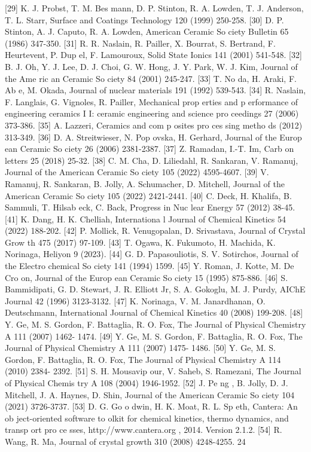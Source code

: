 \documentclass[10pt, letterpaper]{article}
\begin{document}
[29]
 K. J. Probst, T. M. Bes mann, D. P. Stinton, R. A. Lowden, T. J. Anderson, T. L. Starr, Surface and
Coatings Technology 120 (1999) 250-258.
[30]
 D. P. Stinton, A. J. Caputo, R. A. Lowden, American Ceramic So ciety Bulletin 65 (1986) 347-350.
[31]
 R. R. Naslain, R. Pailler, X. Bourrat, S. Bertrand, F. Heurtevent, P. Dup el, F. Lamouroux, Solid State
Ionics 141 (2001) 541-548.
[32]
 B. J. Oh, Y. J. Lee, D. J. Choi, G. W. Hong, J. Y. Park, W. J. Kim, Journal of the Ame ric an Ceramic
So ciety 84 (2001) 245-247.
[33]
 T. No da, H. Araki, F. Ab e, M. Okada, Journal of nuclear materials 191 (1992) 539-543.
[34]
 R. Naslain, F. Langlais, G. Vignoles, R. Pailler, Mechanical prop erties and p erformance of engineering
ceramics I I: ceramic engineering and science pro ceedings 27 (2006) 373-386.
[35]
 A. Lazzeri, Ceramics and com p osites pro ces sing metho ds (2012) 313-349.
[36]
 D. A. Streitwieser, N. Pop ovska, H. Gerhard, Journal of the Europ ean Ceramic So ciety 26 (2006)
2381-2387.
[37]
 Z. Ramadan, I.-T. Im, Carb on letters 25 (2018) 25-32.
[38]
 C. M. Cha, D. Liliedahl, R. Sankaran, V. Ramanuj, Journal of the American Ceramic So ciety 105 (2022)
4595-4607.
[39]
 V. Ramanuj, R. Sankaran, B. Jolly, A. Schumacher, D. Mitchell, Journal of the American Ceramic
So ciety 105 (2022) 2421-2441.
[40]
 C. Deck, H. Khalifa, B. Sammuli, T. Hilsab eck, C. Back, Progress in Nuc lear Energy 57 (2012) 38-45.
[41]
 K. Dang, H. K. Chelliah, Internationa l Journal of Chemical Kinetics 54 (2022) 188-202.
[42]
 P. Mollick, R. Venugopalan, D. Srivastava, Journal of Crystal Grow th 475 (2017) 97-109.
[43]
 T. Ogawa, K. Fukumoto, H. Machida, K. Norinaga, Heliyon 9 (2023).
[44]
 G. D. Papasouliotis, S. V. Sotirchos, Journal of the Electro chemical So ciety 141 (1994) 1599.
[45]
 Y. Roman, J. Kotte, M. De Cro on, Journal of the Europ ean Ceramic So ciety 15 (1995) 875-886.
[46]
 S. Bammidipati, G. D. Stewart, J. R. Elliott Jr, S. A. Gokoglu, M. J. Purdy, AIChE Journal 42 (1996)
3123-3132.
[47]
 K. Norinaga, V. M. Janardhanan, O. Deutschmann, International Journal of Chemical Kinetics 40
(2008) 199-208.
[48]
 Y. Ge, M. S. Gordon, F. Battaglia, R. O. Fox, The Journal of Physical Chemistry A 111 (2007) 1462-
1474.
[49]
 Y. Ge, M. S. Gordon, F. Battaglia, R. O. Fox, The Journal of Physical Chemistry A 111 (2007) 1475-
1486.
[50]
 Y. Ge, M. S. Gordon, F. Battaglia, R. O. Fox, The Journal of Physical Chemistry A 114 (2010) 2384-
2392.
[51]
 S. H. Mousavip our, V. Saheb, S. Ramezani, The Journal of Physical Chemis try A 108 (2004) 1946-1952.
[52]
 J. Pe ng , B. Jolly, D. J. Mitchell, J. A. Haynes, D. Shin, Journal of the American Ceramic So ciety 104
(2021) 3726-3737.
[53]
 D. G. Go o dwin, H. K. Moat, R. L. Sp eth, Cantera: An ob ject-oriented software to olkit for chemical
kinetics, thermo dynamics, and transp ort pro ce sses,
http://www.cantera.org
, 2014. Version 2.1.2.
[54]
 R. Wang, R. Ma, Journal of crystal growth 310 (2008) 4248-4255.
24
\end{document}
